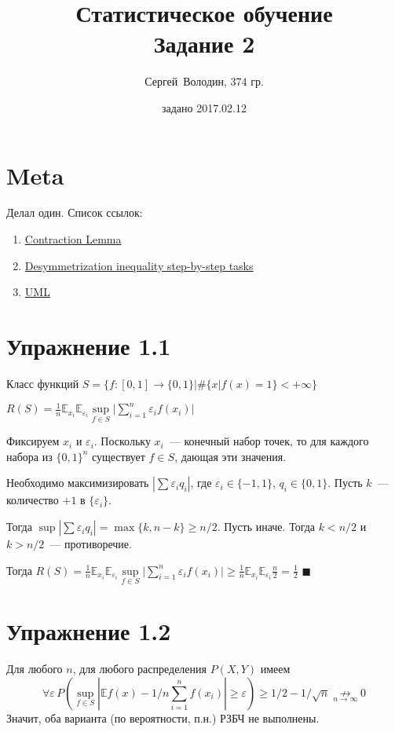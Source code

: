 \documentclass[a4paper]{article}
\title{Статистическое обучение\\Задание 2}
\date{задано 2017.02.12}
\author{Сергей~Володин, 374 гр.}
\newcommand{\E}{\mathbb{E}}
\def\eps{\varepsilon}
\begin{document}
\maketitle
\section*{Meta}
Делал один. Список ссылок:
\begin{enumerate}
\item \href{http://www.jmlr.org/proceedings/papers/v32/mohri14-supp.pdf}{Contraction Lemma}
\item \href{https://ocw.mit.edu/courses/mathematics/18-657-mathematics-of-machine-learning-fall-2015/assignments/MIT18_657F15_PS2.pdf}{Desymmetrization inequality step-by-step tasks}
\item \href{http://www.cs.huji.ac.il/~shais/UnderstandingMachineLearning/understanding-machine-learning-theory-algorithms.pdf}{UML}
\end{enumerate}
\section*{Упражнение 1.1}
Класс функций $S=\{f\colon [0,1]\to\{0,1\}\big| \#\{x|f(x)=1\}<+\infty\}$

$R(S)=\frac{1}{n}\mathbb{E}_{x_i}\mathbb{E}_{\eps_i}\sup\limits_{f\in S}\big|\sum\limits_{i=1}^n\eps_if(x_i)\big|$

Фиксируем $x_i$ и $\eps_i$. Поскольку ${x_i}$~--- конечный набор точек, то для каждого набора из $\{0,1\}^n$ существует $f\in S$, дающая эти значения.

Необходимо максимизировать $|\sum \eps_i q_i|$, где $\eps_i\in\{-1,1\}$, $q_i\in\{0,1\}$. Пусть $k$~--- количество $+1$ в $\{\eps_i\}$.

Тогда $\sup|\sum \eps_i q_i|=\max\{k,n-k\}\geqslant n/2$. Пусть иначе. Тогда $k<n/2$ и $k>n/2$~--- противоречие.

Тогда $R(S)=\frac{1}{n}\mathbb{E}_{x_i}\mathbb{E}_{\eps_i}\sup\limits_{f\in S}\big|\sum\limits_{i=1}^n\eps_if(x_i)\big| \geqslant \frac{1}{n}\mathbb{E}_{x_i}\mathbb{E}_{\eps_i}\frac{n}{2}=\frac{1}{2}$ $\blacksquare$
\section*{Упражнение 1.2}
Для любого $n$, для любого распределения $P(X,Y)$ имеем
$$\forall \eps \,P(\sup\limits_{f\in S}|\E f(x)-1/n\sum\limits_{i=1}^n f(x_i)|\geqslant\eps)\geqslant 1/2-1/\sqrt{n}\underset{n\to\infty}{\not\to}0$$
Значит, оба варианта (по вероятности, п.н.) РЗБЧ не выполнены.
\end{document}
